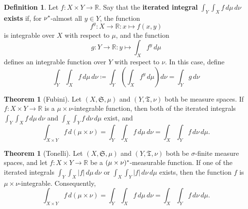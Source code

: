 \documentclass[
twoside=true,
paper=letter,
fontsize=11pt,
pagesize=auto,
leqno,
openany,
headsepline,
overfullrule,
]{scrbook}
\theoremstyle{plain}
\theoremstyle{plain}
\theoremstyle{definition}
\newtheorem{defn}[thm]{Definition}
\theoremstyle{bfnoteitalic}
\newtheorem{thmboldnote}[thm]{Theorem}
\theoremstyle{bfnoteroman}
\newcommand{\term}[1]{\textbf{#1}\index{#1}}
\newcommand{\sigalg}[1]{\mathfrak{#1}}
\newcommand{\definedby}{\coloneqq}
\newcommand{\textsigma}{\hbox{\large{$\sigma$}}\kern-1pt}
\newcommand{\abs}[1]{\left\vert#1\right\vert}
\newcommand{\R}{\mathbb{R}}
\newcommand{\semiring}{\sigalg{S}}
\newcommand{\semiringii}{\sigalg{T}}
\newcommand{\kernast}{\ast\kern-1pt}
\newcommand{\function}{f}
\newcommand{\functionii}{g}
\newcommand{\measurespace}{X}
\newcommand{\measurespaceii}{Y}
\newcommand{\mspaceelt}{x}
\newcommand{\mspaceeltii}{y}
\newcommand{\measure}{\mu}
\newcommand{\measureii}{\nu}
\begin{document}
\begin{defn}\label{product_integration}
Let $\function:\measurespace\times\measurespaceii \to \R$. Say that the \term{iterated integral}
$\int_\measurespaceii \int_\measurespace f\,d\measure\, d\measureii$ \textbf{exists}
if, for 
$\measureii^\kernast$-almost all 
$\mspaceeltii\in\measurespaceii$, the function
\[
\function^\mspaceeltii:\measurespace\to\R 
:\mspaceelt\mapsto\function(\mspaceelt,\mspaceeltii)
\]
is integrable over $\measurespace$ with respect to $\measure$, and the function
\[ 
\functionii:
\measurespaceii\to\R:
\mspaceeltii\mapsto 
\int_\measurespace \function^\mspaceeltii\, d\measure 
\]
defines an integrable function over $\measurespaceii$ with respect to $\measureii$. 
In this case, define
\[
\int_\measurespaceii \int_\measurespace f\,d\measure\, d\measureii
\definedby
\int_\measurespaceii 
\left(
\int_\measurespace 
f^\mspaceeltii \,d\measure
\right)
d\measureii
=
\int_\measurespaceii \functionii\, d\measureii
\]
\end{defn}



\begin{thmboldnote}[Fubini]\label{fubini}
Let
$(\measurespace, \semiring, \measure)$
and
$(\measurespaceii, \semiringii, \measureii)$
both be measure spaces.
If $\function:\measurespace\times\measurespaceii\to\R$ is a
$\measure\times\measureii$-integrable function, then both of the iterated integrals
$\int_\measurespaceii\int_\measurespace \function\, d\measure\,d\measureii$ 
and
$\int_\measurespace\int_\measurespaceii \function \, d\measureii\,d\measure$
exist, and
\[
\int_{\measurespace\times\measurespaceii} \function\, d(\measure\times\measureii)
=
\int_\measurespaceii\int_\measurespace \function\, d\measure\, d\measureii
=
\int_\measurespace\int_\measurespaceii \function\, d\measureii\, d\measure.
\]
\end{thmboldnote}



\begin{thmboldnote}[Tonelli]\label{tonelli}
Let 
$(\measurespace, \semiring, \measure)$
and
$(\measurespaceii, \semiringii, \measureii)$
both be \textsigma-finite measure spaces, and let
$\function:\measurespace\times\measurespaceii\to\R$ be a 
$(\measure\times\measureii)^\kernast$\hyp{}measurable function.
If one of the iterated integrals
$\int_\measurespaceii\int_\measurespace \abs{\function} \, d\measure\,d\measureii$ 
or
$\int_\measurespace\int_\measurespaceii \abs{\function} \, d\measureii\,d\measure$
exists, then the function $\function$ is $\measure\times\measureii$-integrable. Consequently, 
\[
\int_{\measurespace\times\measurespaceii} \function\, d(\measure\times\measureii)
=
\int_\measurespaceii\int_\measurespace \function\, d\measure\, d\measureii
=
\int_\measurespace\int_\measurespaceii \function\, d\measureii\, d\measure.
\]
\end{thmboldnote}
\end{document}
